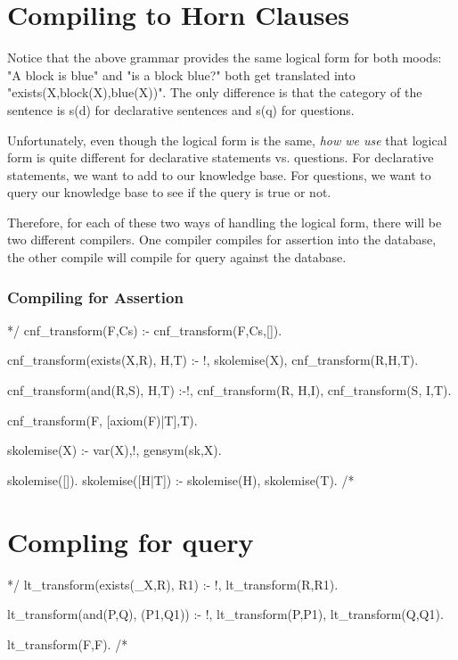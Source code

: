 \documentclass{book}[9pt]
\newenvironment{code}%
{\small \verbatim}%
{\endverbatim \large}
\begin{document}
\section{Compiling to Horn Clauses}

Notice that the above grammar provides the same logical form for both
moods: "A block is blue" and "is a block blue?" both get translated
into "exists(X,block(X),blue(X))".  The only difference is that the
category of the sentence is s(d) for declarative sentences and s(q)
for questions.

Unfortunately, even though the logical form is the same, {\em how we
use} that logical form is quite different for declarative statements
vs. questions.  For declarative statements, we want to add to our
knowledge base.  For questions, we want to query our knowledge base to
see if the query is true or not.

Therefore, for each of these two ways of handling the logical form,
there will be two different compilers.  One compiler compiles for
assertion into the database, the other compile will compile for query
against the database.


\subsubsection{Compiling for Assertion}

\begin{code}
*/
cnf_transform(F,Cs) :- cnf_transform(F,Cs,[]).

cnf_transform(exists(X,R), H,T) :- !,
        skolemise(X),
        cnf_transform(R,H,T).

cnf_transform(and(R,S), H,T) :-!,
        cnf_transform(R, H,I),
        cnf_transform(S, I,T).

cnf_transform(F, [axiom(F)|T],T).

skolemise(X) :- var(X),!, 
	gensym(sk,X).

skolemise([]).
skolemise([H|T]) :-
	skolemise(H),
	skolemise(T).
/*
\end{code}

\section{Compling for query}

\begin{code}
*/
lt_transform(exists(_X,R), R1) :- !,
        lt_transform(R,R1).

lt_transform(and(P,Q), (P1,Q1)) :- !,
        lt_transform(P,P1),
        lt_transform(Q,Q1).

lt_transform(F,F).
/*
\end{code}
\end{document}
